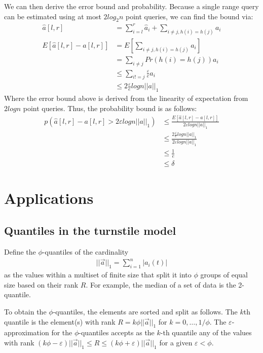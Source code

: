 \documentclass[11pt]{article}
\begin{document}
    We can then derive the error bound and probability. Because a single range query can be estimated using at most $2log_2n$ point queries, we can find the bound via:
\begin{align*}
    \hat a[l,r] &= \sum_{i = l}^r \hat a_i + \sum_{i \neq j, h(i)=h(j)} a_i\\
    E[\hat a[l,r] - a[l,r]] &= E[\sum_{i \neq j, h(i)=h(j)} a_i]\\
    &= \sum_{i \neq j}Pr(h(i) = h(j)) a_i\\
    &\leq \sum_{i!=j} \frac{\varepsilon}{e} a_i\\
    &\leq 2\frac{\varepsilon}{e} logn ||a||_1
\end{align*}
Where the error bound above is derived from the linearity of expectation from $2logn$ point queries. Thus, the probability bound is as follows:
\begin{align*}
    p(\hat a[l,r] - a[l,r] > 2\varepsilon logn ||a||_1) &\leq \frac{E[\hat a[l,r] - a[l,r]]}{2\varepsilon logn||a||_1}\\
    &\leq \frac{2\frac{\varepsilon}{e}logn ||a||_1}{2\varepsilon logn ||a||_1}\\
    &\leq \frac{1}{e}\\
    &\leq \delta
\end{align*}
\section{Applications}

\subsection{Quantiles in the turnstile model}
Define the $\phi$-quantiles of the cardinality
\begin{align}
    ||\vec{a}||_1 = \sum_{i = 1}^{n}|a_i(t)|
\end{align}
as the values within a multiset of finite size that split it into $\phi$ groups
of equal size based on their rank $R$.  For example, the median of a set of data
is the 2-quantile. 

To obtain the $\phi$-quantiles, the elements are sorted and split as follows.
The $k$th quantile is the element(s) with rank $R = k\phi||\vec{a}||_1$ for $k =
0, \dots, 1/\phi$.  The $\varepsilon$-approximation for the $\phi$-quantiles
accepts as the $k$-th quantile any of the  values with rank $(k\phi -
\varepsilon)||\vec{a}||_1 \leq R \leq (k\phi + \varepsilon)||\vec{a}||_1$ for a
given $\varepsilon < \phi$.
\end{document}
